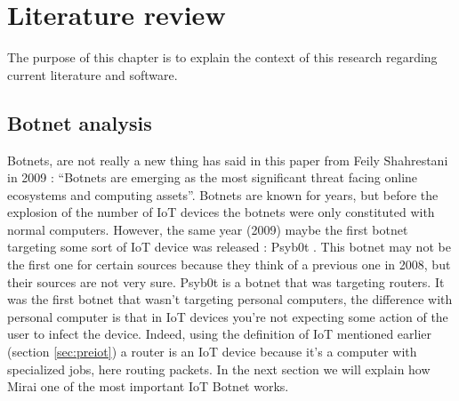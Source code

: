\documentclass{report}
\begin{document}
\chapter{Literature review}
The purpose of this chapter is to explain the context of this research regarding current literature and software.\newline

\section{Botnet analysis}
Botnets, are not really a new thing has said in this paper from Feily Shahrestani in 2009 \autocite{feily2009survey} : ``Botnets are emerging as the most significant threat facing online ecosystems and computing assets''. Botnets are known for years, but before the explosion of the number of IoT devices the botnets were only constituted with normal computers. However, the same year (2009) maybe the first botnet targeting some sort of IoT device was released : Psyb0t \autocite{durfina2013psybot}. This botnet may not be the first one for certain sources \autocite{angrishi2017turning} because they think of a previous one in 2008, but their sources are not very sure. Psyb0t is a botnet that was targeting routers. It was the first botnet that wasn't targeting personal computers, the difference with personal computer is that in IoT devices you're not expecting some action of the user to infect the device. Indeed, using the definition of IoT mentioned earlier (section \ref{sec:preiot}) a router is an IoT device because it's a computer with specialized jobs, here routing packets.\newline
In the next section we will explain how Mirai one of the most important IoT Botnet works.
\end{document}
